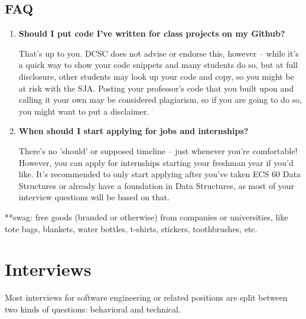 \documentclass{article}
\begin{document}
\subsection{FAQ}
\begin{enumerate}
    \item \textbf{Should I put code I've written for class projects on my Github?}
    \begin{itemize}
        That's up to you. DCSC does not advise or endorse this, however -- while it's a quick way to show your code snippets and many students do so, but at full disclosure, other students may look up your code and copy, so you might be at risk with the SJA. Posting your professor's code that you built upon and calling it your own may be considered plagiarism, so if you are going to do so, you might want to put a disclaimer. 
    \end{itemize}
    \item \textbf{When should I start applying for jobs and internships?}
    \begin{itemize}
        There's no 'should' or supposed timeline -- just whenever you're comfortable! However, you can apply for internships starting your freshman year if you'd like. It's recommended to only start applying after you've taken ECS 60 Data Structures or already have a foundation in Data Structures, as most of your interview questions will be based on that. 
    \end{itemize}
\end{enumerate}
**swag: free goods (branded or otherwise) from companies or universities, like tote bags, blankets, water bottles, t-shirts, stickers, toothbrushes, etc.
\newpage
\section {Interviews}
\label{sec:interviews}
\hspace{0.5cm}Most interviews for software engineering or related positions are split between two kinds of questions: behavioral and technical.  
\end{document}
